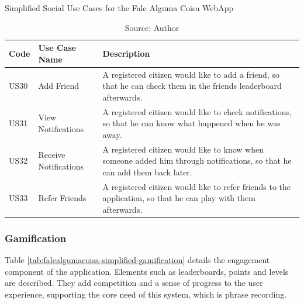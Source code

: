 \begin{table}[h]
\caption{Simplified Social Use Cases for the Fale Alguma Coisa WebApp}
\label{tab:falealgumacoisa-simplified-social}
\centering
\begin{tabular}{|p{1cm}|p{3cm}|p{10cm}|}
\hline
    Code & Use Case Name & Description \\ \hline
    US30 & Add Friend & A registered citizen would like to add a friend, so that he can check them in the friends leaderboard afterwards. \\ \hline
    US31 & View Notifications & A registered citizen would like to check notifications, so that he can know what happened when he was away. \\ \hline
    US32 & Receive Notifications & A registered citizen would like to know when someone added him through notifications, so that he can add them back later. \\ \hline
    US33 & Refer Friends & A registered citizen would like to refer friends to the application, so that he can play with them afterwards. \\ \hline
\end{tabular}
\caption*{Source: Author}
\end{table}

\subsubsection{Gamification}

Table \ref{tab:falealgumacoisa-simplified-gamification} details the engagement component of the application. Elements such as leaderboards, points and levels are described. They add competition and a sense of progress to the user experience, supporting the core need of this system, which is phrase recording.


